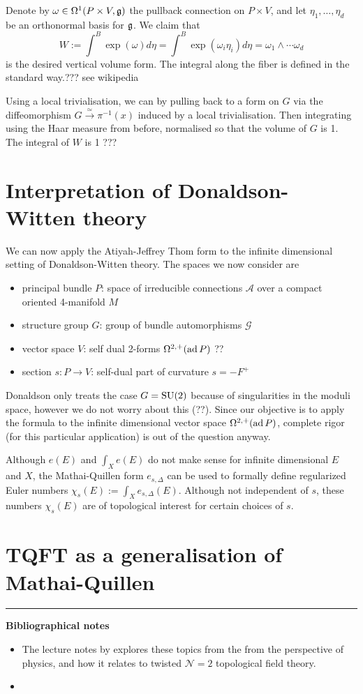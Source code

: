 Denote by $\omega \in \Omega^1(P\times V,\operatorname{\mathfrak{g}})$ the pullback connection on
$P\times V$, and let $\eta_1,\ldots,\eta_d$ be an orthonormal basis for $\operatorname{\mathfrak{g}}$. We claim that
\[
W := \int^B \exp(\omega) d\eta 
= \int^B \exp(\omega_i\eta_i) d\eta = \omega_1 \wedge \cdots \omega_d
\] 
is the desired vertical volume form. The integral along the fiber is defined in
the standard way.??? see wikipedia

Using a local trivialisation, we can 
by pulling back to a form on $G$ via the diffeomorphism
$G\xrightarrow{\simeq} \pi^{-1}(x)$ induced by a local trivialisation. Then
integrating using the Haar measure from before, 
normalised so that the volume of $G$ is 1. 
The integral of $W$ is 1 ???

\section{Interpretation of Donaldson-Witten theory}
We can now apply the Atiyah-Jeffrey Thom form to the infinite dimensional
setting of Donaldson-Witten theory. 
The spaces we now consider are 
\begin{itemize}
	\item principal bundle $P$: space of irreducible connections  $\mathcal{A}$ 
		over a compact oriented 4-manifold $M$
	\item structure group $G$: group of bundle automorphisms  $\mathcal{G}$ 
	\item vector space $V$: self dual 2-forms $\Omega^{2,+}(\operatorname{ad} P)$ ??
	\item section $s:P\to V$: self-dual part of curvature  $s=-F^+$
\end{itemize}
Donaldson only treats the case $G=\operatorname{SU}(2)$ because of singularities in the moduli
space, however we do not worry about this (??). Since our objective is to apply the
formula to the infinite dimensional vector space $\Omega^{2,+}(\operatorname{ad} P)$, complete
rigor (for this particular application) is out of the question anyway. 

Although $e(E)$ and  $\int_X e(E)$ do not make sense for
infinite dimensional  $E$ and  $X$, the Mathai-Quillen form  $e_{s,\Delta}$ can
be used to formally define regularized Euler numbers $\chi_s(E) := \int_X
e_{s,\Delta}(E)$. Although not independent of $s$, these numbers  $\chi_s(E)$
are of topological interest for certain choices of  $s$.  


\section{TQFT as a generalisation of Mathai-Quillen}


\vspace{5mm}
\hrule 
\vspace{5mm}

\textbf{Bibliographical notes}
{\small
\begin{itemize}
	\item The lecture notes by \citet{cordes95} explores these topics from the
	from the perspective of physics, and how it relates to twisted
	$\mathcal{N}=2$ topological field theory.
	\item 
\end{itemize}
}


